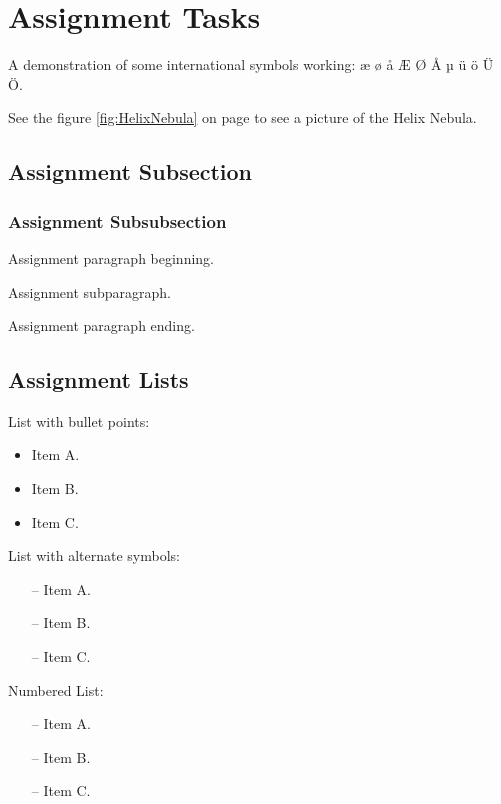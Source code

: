 \documentclass[
english, %
headsepline, %
]{scrartcl} %
\begin{document}
\tableofcontents %

\listoffigures %

\listoftables %

\section{Assignment Tasks} 
\label{sec:Assignment Tasks}
    A demonstration of some international symbols working: æ ø å Æ Ø Å µ ü ö Ü Ö.

    See the figure \ref{fig:HelixNebula} on page \pageref{fig:HelixNebula} to see a picture of the Helix Nebula.
 \subsection{Assignment Subsection}
 \label{sec:Assignment Subsection}
    \subsubsection{Assignment Subsubsection}
    \label{sec:Assignment Subsubsection}
        \begin{paragraph}           
            Assignment paragraph beginning.
            \begin{subparagraph}
                Assignment subparagraph.
            \end{subparagraph}\label{Assignment subparagraph} 
            Assignment paragraph ending.
        \end{paragraph}\label{Assignment paragraph}

    \subsection{Assignment Lists}
        List with bullet points:
        \begin{itemize}
            \item Item A.
            \item Item B.
            \item Item C.
        \end{itemize}
        List with alternate symbols:
        \begin{itemize}
            \item[--] Item A.
            \item[--] Item B.
            \item[--] Item C.
        \end{itemize}
        Numbered List:
        \begin{enumerate}
            \item[--] Item A.
            \item[--] Item B.
            \item[--] Item C.
        \end{enumerate}
\end{document}
